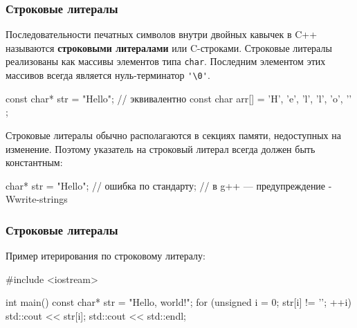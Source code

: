 \documentclass[compress, 8pt, aspectratio=169]{beamer}
\begin{document}
\begin{frame}[fragile]

    \frametitle{Строковые литералы}

    Последовательности печатных символов внутри двойных кавычек в C++
    называются \textbf{строковыми литералами}\footnotemark{} или C-строками.
    Строковые литералы реализованы как массивы элементов типа \verb|char|.
    Последним элементом этих массивов всегда является нуль-терминатор \verb|'\0'|.


    \begin{myinplacelisting}[minted language=cpp]
const char* str = "Hello";
// эквивалентно
const char arr[] = { 'H', 'e', 'l', 'l', 'o', '\0' };
    \end{myinplacelisting}

    Строковые литералы обычно располагаются в секциях памяти, недоступных
    на изменение.
    Поэтому указатель на строковый литерал всегда должен быть константным:

    \begin{myinplacelisting}[minted language=cpp]
char* str = "Hello"; // ошибка по стандарту;
                     // в g++ — предупреждение -Wwrite-strings
    \end{myinplacelisting}

\end{frame}

\begin{frame}[fragile]

    \frametitle{Строковые литералы}

    Пример итерирования по строковому литералу:

    \begin{myinplacelisting}[minted language=cpp]
#include <iostream>

int main() {
    const char* str = "Hello, world!";
    for (unsigned i = 0; str[i] != '\0'; ++i) {
        std::cout << str[i];
    }
    std::cout << std::endl;
}
    \end{myinplacelisting}

\end{frame}
\end{document}
